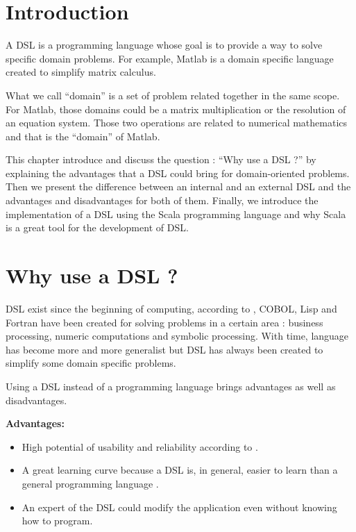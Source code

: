 \label{cha:a-dsl}

\section{Introduction}
\label{sec:dsl_intro}

A \gls{DSL} is a programming language whose goal is
to provide a way to solve specific domain problems. For example, Matlab is a
domain specific language created to simplify matrix calculus.

What we call ``domain'' is a set of problem related together in the same scope.
For Matlab, those domains could be a matrix multiplication or the resolution of an
equation system. Those two operations are related to numerical mathematics and
that is the ``domain'' of Matlab.

This chapter introduce and discuss the question : ``Why use a DSL ?'' by
explaining the advantages that a \gls{DSL} could bring for domain-oriented
problems. Then we present the difference between an internal and an external DSL
and the advantages and disadvantages for both of them. Finally, we introduce the
implementation of a \gls{DSL} using the Scala programming language and why Scala
is a great tool for the development of \gls{DSL}.

\section{Why use a DSL ?}
\label{sec:why-use-dsl}

\gls{DSL} exist since the beginning of computing, according to
\cite{VanDeursen2000}, COBOL, Lisp and Fortran have been
created for solving problems in a certain area : business processing, numeric
computations and symbolic processing. With time, language has become more and
more generalist but \gls{DSL} has always been created to simplify some domain
specific problems.

Using a DSL instead of a programming language brings advantages as well as
disadvantages.

\textbf{Advantages:}
\begin{itemize}
\item High potential of usability and reliability according to
  \cite{Tolvanen2010}.
\item A great learning curve because a DSL is, in general, easier to learn than a
  general programming language \cite{Mernik2005}.
\item An expert of the DSL could modify the application even without knowing how
  to program.
\end{itemize}

